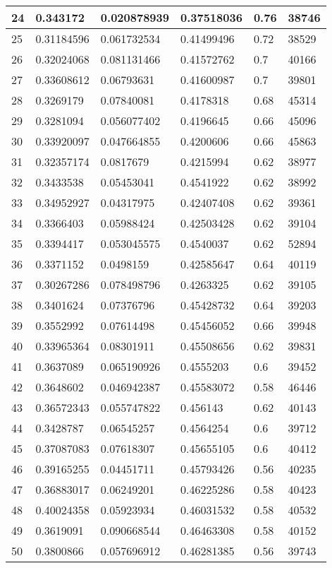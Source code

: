 \begin{longtable}{|l|l|l|l|l|l|}
24 & 0.343172 & 0.020878939 & 0.37518036 & 0.76 & 38746 \\ \hline 
25 & 0.31184596 & 0.061732534 & 0.41499496 & 0.72 & 38529 \\ \hline 
26 & 0.32024068 & 0.081131466 & 0.41572762 & 0.7 & 40166 \\ \hline 
27 & 0.33608612 & 0.06793631 & 0.41600987 & 0.7 & 39801 \\ \hline 
28 & 0.3269179 & 0.07840081 & 0.4178318 & 0.68 & 45314 \\ \hline 
29 & 0.3281094 & 0.056077402 & 0.4196645 & 0.66 & 45096 \\ \hline 
30 & 0.33920097 & 0.047664855 & 0.4200606 & 0.66 & 45863 \\ \hline 
31 & 0.32357174 & 0.0817679 & 0.4215994 & 0.62 & 38977 \\ \hline 
32 & 0.3433538 & 0.05453041 & 0.4541922 & 0.62 & 38992 \\ \hline 
33 & 0.34952927 & 0.04317975 & 0.42407408 & 0.62 & 39361 \\ \hline 
34 & 0.3366403 & 0.05988424 & 0.42503428 & 0.62 & 39104 \\ \hline 
35 & 0.3394417 & 0.053045575 & 0.4540037 & 0.62 & 52894 \\ \hline 
36 & 0.3371152 & 0.0498159 & 0.42585647 & 0.64 & 40119 \\ \hline 
37 & 0.30267286 & 0.078498796 & 0.4263325 & 0.62 & 39105 \\ \hline 
38 & 0.3401624 & 0.07376796 & 0.45428732 & 0.64 & 39203 \\ \hline 
39 & 0.3552992 & 0.07614498 & 0.45456052 & 0.66 & 39948 \\ \hline 
40 & 0.33965364 & 0.08301911 & 0.45508656 & 0.62 & 39831 \\ \hline 
41 & 0.3637089 & 0.065190926 & 0.4555203 & 0.6 & 39452 \\ \hline 
42 & 0.3648602 & 0.046942387 & 0.45583072 & 0.58 & 46446 \\ \hline 
43 & 0.36572343 & 0.055747822 & 0.456143 & 0.62 & 40143 \\ \hline 
44 & 0.3428787 & 0.06545257 & 0.4564254 & 0.6 & 39712 \\ \hline 
45 & 0.37087083 & 0.07618307 & 0.45655105 & 0.6 & 40412 \\ \hline 
46 & 0.39165255 & 0.04451711 & 0.45793426 & 0.56 & 40235 \\ \hline 
47 & 0.36883017 & 0.06249201 & 0.46225286 & 0.58 & 40423 \\ \hline 
48 & 0.40024358 & 0.05923934 & 0.46031532 & 0.58 & 40532 \\ \hline 
49 & 0.3619091 & 0.090668544 & 0.46463308 & 0.58 & 40152 \\ \hline 
50 & 0.3800866 & 0.057696912 & 0.46281385 & 0.56 & 39743 \\ \hline 
\end{longtable}
